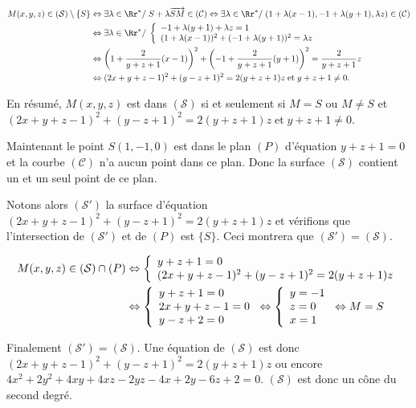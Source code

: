 {\begin{enumerate}
{\begin{align*}\ensuremath
M(x,y,z)\in(\mathcal{S})\setminus\{S\}&\Leftrightarrow\exists\lambda\in\Rr^*/\;S+\lambda\overrightarrow{SM}\in(\mathcal{C})\Leftrightarrow\exists\lambda\in\Rr^*/\;(1+\lambda(x-1),-1+\lambda(y+1),\lambda z)\in(\mathcal{C})\\
 &\Leftrightarrow \exists\lambda\in\Rr^*/\;\left\{
\begin{array}{l}
-1+\lambda(y+1)+\lambda z=1\\
(1+\lambda(x-1))^2+(-1+\lambda(y+1))^2=\lambda z
\end{array}
\right.\\
 &\Leftrightarrow\left(1+\frac{2}{y+z+1}(x-1)\right)^2+\left(-1+\frac{2}{y+z+1}(y+1)\right)^2=\frac{2}{y+z+1}z \\
 &\Leftrightarrow (2x+y+z-1)^2 + (y-z+1)^2 = 2(y+z+1)z\;\text{et}\;y+z+1\neq0.
\end{align*}

En résumé, $M(x,y,z)$ est dans $(\mathcal{S})$ si et seulement si $M=S$ ou $M\neq S$ et $(2x+y+z-1)^2 + (y-z+1)^2 = 2(y+z+1)z\;\text{et}\;y+z+1\neq0$.

Maintenant le point $S(1,-1,0)$ est dans le plan $(P)$ d'équation $y+z+1 = 0$ et la courbe $(\mathcal{C})$ n'a aucun point dans ce plan. Donc la surface $(\mathcal{S})$ contient un et un seul point de ce plan.

Notons alors $(\mathcal{S}')$ la surface d'équation $(2x+y+z-1)^2 + (y-z+1)^2 = 2(y+z+1)z$ et vérifions que l'intersection de $(\mathcal{S}')$ et de $(P)$ est $\{S\}$. Ceci montrera que $(\mathcal{S}')=(\mathcal{S})$.

\begin{align*}\ensuremath
M(x,y,z)\in(\mathcal{S})\cap(P)&\Leftrightarrow\left\{
\begin{array}{l}
y+z+1=0\\
(2x+y+z-1)^2 + (y-z+1)^2 = 2(y+z+1)z
\end{array}
\right.\\
 &\Leftrightarrow\left\{
\begin{array}{l}
y+z+1=0\\
2x+y+z-1=0\\
y-z+2=0
\end{array}
\right.\Leftrightarrow\left\{
\begin{array}{l}
y=-1\\
z=0\\
x=1
\end{array}
\right.\Leftrightarrow M=S
\end{align*}

Finalement $(\mathcal{S}')=(\mathcal{S})$. Une équation de $(\mathcal{S})$ est donc $(2x+y+z-1)^2 + (y-z+1)^2 = 2(y+z+1)z$ ou encore $4x^2+2y^2+4xy+4xz-2yz-4x+2y-6z+2= 0$. $(\mathcal{S})$ est donc un cône du second degré.}
\end{enumerate}
}